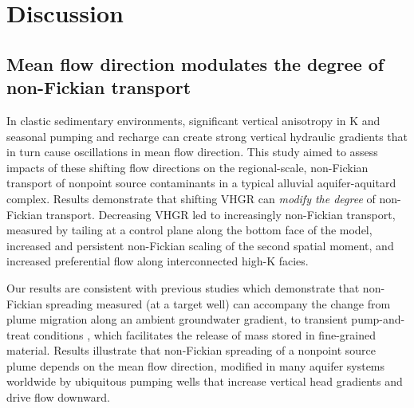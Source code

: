
\section{Discussion}

%
%
\subsection{Mean flow direction modulates the degree of non-Fickian transport}
\label{ss_4_1}

In clastic sedimentary environments, significant vertical anisotropy in K and seasonal pumping and recharge can create strong vertical hydraulic gradients that in turn cause oscillations in mean flow direction. This study aimed to assess impacts of these shifting flow directions on the regional-scale, non-Fickian transport of nonpoint source contaminants in a typical alluvial aquifer-aquitard complex. Results demonstrate that shifting VHGR can \textit{modify the degree} of non-Fickian transport. Decreasing VHGR led to increasingly non-Fickian transport, measured by tailing at a control plane along the bottom face of the model, increased and persistent non-Fickian scaling of the second spatial moment, and increased preferential flow along interconnected high-K facies. 

Our results are consistent with previous studies which demonstrate that non-Fickian spreading measured (at a target well) can accompany the change from plume migration along an ambient groundwater gradient, to transient pump-and-treat conditions \citep{labolle2001role, guo2019upscaling, guswa2000slow}, which facilitates the release of mass stored in fine-grained material. Results illustrate that non-Fickian spreading of a nonpoint source plume depends on the mean flow direction, modified in many aquifer systems worldwide by ubiquitous pumping wells \citep{Famiglietti2014, Gleeson2012, wada2010global} that increase vertical head gradients and drive flow downward. 

